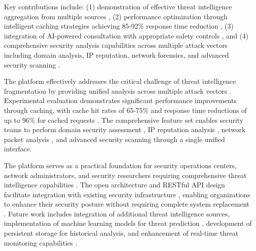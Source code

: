 \documentclass[conference]{IEEEtran}
\begin{document}
Key contributions include: (1) demonstration of effective threat intelligence aggregation from multiple sources \cite{b1,b10}, (2) performance optimization through intelligent caching strategies achieving 85-92\% response time reduction \cite{b18}, (3) integration of AI-powered consultation with appropriate safety controls \cite{b15,b16}, and (4) comprehensive security analysis capabilities across multiple attack vectors including domain analysis, IP reputation, network forensics, and advanced security scanning \cite{b5,b9}.

The platform effectively addresses the critical challenge of threat intelligence fragmentation by providing unified analysis across multiple attack vectors \cite{b1}. Experimental evaluation demonstrates significant performance improvements through caching, with cache hit rates of 65-75\% and response time reductions of up to 96\% for cached requests \cite{b18}. The comprehensive feature set enables security teams to perform domain security assessment \cite{b5,b9}, IP reputation analysis \cite{b13}, network packet analysis \cite{b5}, and advanced security scanning through a single unified interface.

The platform serves as a practical foundation for security operations centers, network administrators, and security researchers requiring comprehensive threat intelligence capabilities \cite{b1}. The open architecture and RESTful API design facilitate integration with existing security infrastructure \cite{b7}, enabling organizations to enhance their security posture without requiring complete system replacement \cite{b9}. Future work includes integration of additional threat intelligence sources, implementation of machine learning models for threat prediction \cite{b1,b13}, development of persistent storage for historical analysis, and enhancement of real-time threat monitoring capabilities \cite{b5,b15}.
\end{document}
